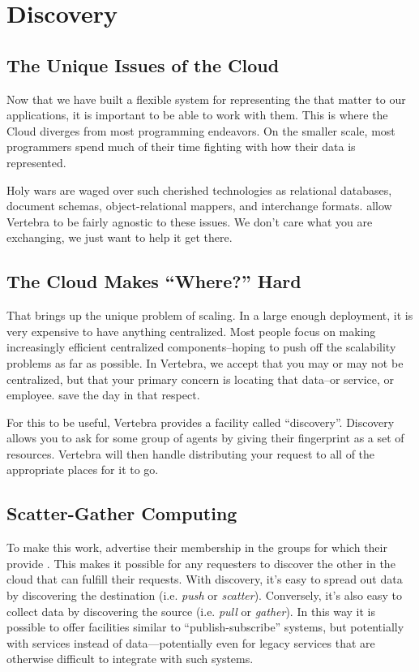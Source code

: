 \section{Discovery}


\subsection{The Unique Issues of the Cloud}

Now that we have built a flexible system for representing the \resources{} that matter to our applications, it is important to be able to work with them.  This is where the Cloud diverges from most programming endeavors.  On the smaller scale, most programmers spend much of their time fighting with how their data is represented.

Holy wars are waged over such cherished technologies as relational databases, document schemas, object-relational mappers, and interchange formats.  \Resources{} allow Vertebra to be fairly agnostic to these issues.  We don't care what you are exchanging, we just want to help it get there.

\subsection{The Cloud Makes ``Where?'' Hard}

That brings up the unique problem of scaling.  In a large enough deployment, it is very expensive to have anything centralized.  Most people focus on making increasingly efficient centralized components--hoping to push off the scalability problems as far as possible.  In Vertebra, we accept that you may or may not be centralized, but that your primary concern is locating that data--or service, or employee.  \Resources{} save the day in that respect.

For this to be useful, Vertebra provides a facility called ``discovery''.  Discovery allows you to ask for some group of agents by giving their fingerprint as a set of resources.  Vertebra will then handle distributing your request to all of the appropriate places for it to go.

\subsection{Scatter-Gather Computing}

To make this work, \agents{} advertise their membership in the groups for which their \actors{} provide \resources{}.  This makes it possible for any requesters to discover the other \agents{} in the cloud that can fulfill their requests.  With discovery, it's easy to spread out data by discovering the destination (i.e. \emph{push} or \emph{scatter}).  Conversely, it's also easy to collect data by discovering the source (i.e. \emph{pull} or \emph{gather}).  In this way it is possible to offer facilities similar to ``publish-subscribe'' systems, but potentially with services instead of data---potentially even for legacy services that are otherwise difficult to integrate with such systems.

